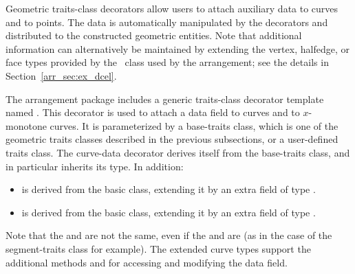 Geometric traits-class decorators allow users to attach auxiliary
data to curves and to points. The data is automatically manipulated 
by the decorators and distributed to the constructed geometric entities. 
Note that additional information can alternatively be maintained by extending 
the vertex, halfedge, or face types provided by the \dcel\ class used 
by the arrangement; see the details in Section~\ref{arr_sec:ex_dcel}.

The arrangement package includes a generic traits-class decorator
template named 
.
This decorator is used to attach a data field to curves and to
$x$-monotone curves. It is parameterized by a base-traits class, which is
one of the geometric traits classes described in the previous subsections, or
a user-defined traits class. The curve-data decorator derives itself from the
base-traits class, and in particular inherits its  type.
In addition:
\begin{itemize}
\item {} is derived from the basic 
class, extending it by an extra field of type .
%
\item {} is derived from the basic
 class, extending it by an extra field of
type .
\end{itemize}
Note that the  and  are not
the same, even if the  and
 are (as in the case of the 
segment-traits class for example). The extended curve types support the
additional methods  and  for
accessing and modifying the data field.

